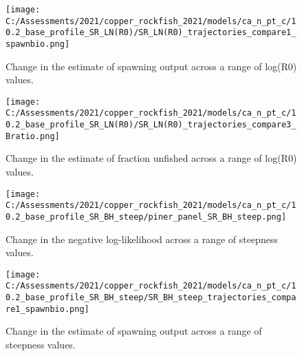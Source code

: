 \documentclass[11pt,
  english,
  a4paper,
]{article}
\begin{document}
\tagmcend\tagstructend


\begin{figure}
\centering
\texttt{[image: C:/Assessments/2021/copper\_rockfish\_2021/models/ca\_n\_pt\_c/10.2\_base\_profile\_SR\_LN(R0)/SR\_LN(R0)\_trajectories\_compare1\_spawnbio.png]}
\caption{Change in the estimate of spawning output across a range of log(R0) values.\label{fig:r0-ssb}}
\end{figure}

\tagmcend\tagstructend


\begin{figure}
\centering
\texttt{[image: C:/Assessments/2021/copper\_rockfish\_2021/models/ca\_n\_pt\_c/10.2\_base\_profile\_SR\_LN(R0)/SR\_LN(R0)\_trajectories\_compare3\_Bratio.png]}
\caption{Change in the estimate of fraction unfished across a range of log(R0) values.\label{fig:r0-depl}}
\end{figure}

\tagmcend\tagstructend


\begin{figure}
\centering
\texttt{[image: C:/Assessments/2021/copper\_rockfish\_2021/models/ca\_n\_pt\_c/10.2\_base\_profile\_SR\_BH\_steep/piner\_panel\_SR\_BH\_steep.png]}
\caption{Change in the negative log-likelihood across a range of steepness values.\label{fig:h-profile}}
\end{figure}

\tagmcend\tagstructend


\begin{figure}
\centering
\texttt{[image: C:/Assessments/2021/copper\_rockfish\_2021/models/ca\_n\_pt\_c/10.2\_base\_profile\_SR\_BH\_steep/SR\_BH\_steep\_trajectories\_compare1\_spawnbio.png]}
\caption{Change in the estimate of spawning output across a range of steepness values.\label{fig:h-ssb}}
\end{figure}
\end{document}
